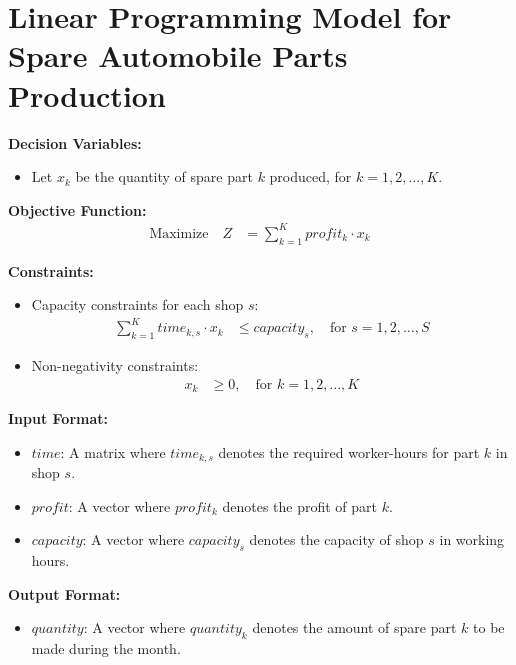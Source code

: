 \documentclass{article}
\begin{document}
\section*{Linear Programming Model for Spare Automobile Parts Production}

\textbf{Decision Variables:}
\begin{itemize}
    \item Let \( x_k \) be the quantity of spare part \( k \) produced, for \( k = 1, 2, \ldots, K \).
\end{itemize}

\textbf{Objective Function:}
\begin{align*}
\text{Maximize} \quad Z &= \sum_{k=1}^{K} profit_k \cdot x_k
\end{align*}

\textbf{Constraints:}
\begin{itemize}
    \item Capacity constraints for each shop \( s \):
    \begin{align*}
    \sum_{k=1}^{K} time_{k, s} \cdot x_k &\leq capacity_s, \quad \text{for } s = 1, 2, \ldots, S
    \end{align*}
    \item Non-negativity constraints:
    \begin{align*}
    x_k &\geq 0, \quad \text{for } k = 1, 2, \ldots, K
    \end{align*}
\end{itemize}

\textbf{Input Format:}
\begin{itemize}
    \item \( time \): A matrix where \( time_{k,s} \) denotes the required worker-hours for part \( k \) in shop \( s \).
    \item \( profit \): A vector where \( profit_k \) denotes the profit of part \( k \).
    \item \( capacity \): A vector where \( capacity_s \) denotes the capacity of shop \( s \) in working hours.
\end{itemize}

\textbf{Output Format:}
\begin{itemize}
    \item \( quantity \): A vector where \( quantity_k \) denotes the amount of spare part \( k \) to be made during the month.
\end{itemize}
\end{document}
